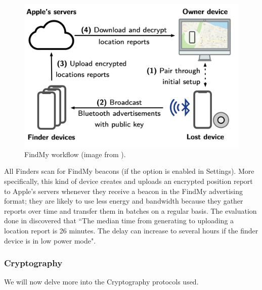 \documentclass[english]{article}
\begin{document}
\begin{figure}[]
	\centering
	\includegraphics[width=.5\textwidth]{images/process.png}
	\caption{FindMy workflow (image from \cite{whocanfind}).}
	\label{process}
\end{figure}
All Finders scan for FindMy beacons (if the option is enabled in Settings).
More specifically, this kind of device creates and uploads an encrypted position report to Apple's servers whenever they receive a beacon in the FindMy advertising format; they are likely to use less energy and bandwidth because they gather reports over time and transfer them in batches on a regular basis. The evaluation done in \cite{whocanfind} discovered that ``The median time from generating to uploading a location report is 26 minutes. The delay can increase to several hours if the finder device is in low power mode".

\subsubsection{Cryptography} \label{sec:crypto}
We will now delve more into the Cryptography protocols used. 
\end{document}
